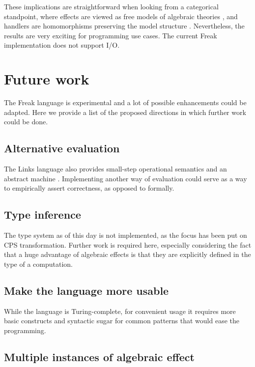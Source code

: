 \documentclass{article}
\theoremstyle{definition}
\theoremstyle{lemma}
\theoremstyle{observation}
\theoremstyle{theorem}
\begin{document}
    These implications are straightforward when looking from a categorical
    standpoint, where effects are viewed as free models of algebraic theories
    \cite{adequacy}, and handlers are homomorphisms preserving the model structure
    \cite{handlers}. Nevertheless, the results are very exciting for programming
    use cases. The current Freak implementation does not support I/O.

\section{Future work}

    The Freak language is experimental and a lot of possible enhancements
    could be adapted. Here we provide a list of the proposed directions in which
    further work could be done.

    \subsection{Alternative evaluation}

    The Links language also provides small-step operational semantics and
    an abstract machine \cite{liberating-effects}. Implementing another way
    of evaluation could serve as a way to empirically assert correctness,
    as opposed to formally.

    \subsection{Type inference}

    The type system as of this day is not implemented, as the focus has been put
    on CPS transformation. Further work is required here, especially considering
    the fact that a huge advantage of algebraic effects is that they are explicitly
    defined in the type of a computation.

    \subsection{Make the language more usable}

    While the language is Turing-complete, for convenient usage it
    requires more basic constructs and syntactic sugar for common patterns
    that would ease the programming.

    \subsection{Multiple instances of algebraic effect}
\end{document}
